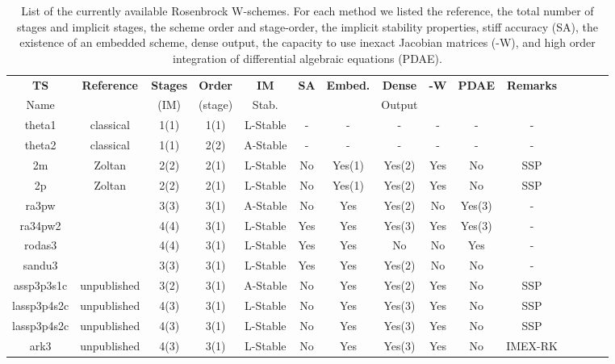 %
\begin{table}
\centering
\caption{\label{tab:IMEX:RosW:PETSc}List
of the currently available Rosenbrock W-schemes. For each method we listed the reference, the total number
  of stages and implicit stages, the scheme order and stage-order,
  the implicit stability properties, stiff accuracy (SA), the
  existence of an embedded scheme, dense output, the capacity to use
  inexact Jacobian matrices (-W), and high order integration of differential
  algebraic equations (PDAE).}
{\scriptsize
\begin{tabular}{|c|c|c|c|c|c|c|c|c|c|c|c|c|c|c|}
\hline
{\bf TS} &{\bf Reference}& {\bf Stages} &{\bf Order}&{\bf IM}     &{\bf SA}&{\bf Embed.}&{\bf Dense}&{\bf -W}&{\bf PDAE} &{\bf Remarks}\\
Name &  &(IM)   &(stage)&Stab.&&      &Output&&&\\
\hline
theta1& classical&
1(1)&1(1)&L-Stable&-&-&-&-&-&-\\
\hline
theta2& classical&
1(1)&2(2)&A-Stable&-&-&-&-&-&-\\
\hline
2m             &Zoltan&
2(2)&2(1)&L-Stable&No&Yes(1)&Yes(2)&Yes&No&SSP\\
\hline
2p             &Zoltan&
2(2)&2(1)&L-Stable&No&Yes(1)&Yes(2)&Yes&No&SSP\\
\hline
ra3pw          &\cite{Rang_2005}&
3(3)&3(1)&A-Stable&No&Yes&Yes(2)&No&Yes(3)&-\\
\hline
ra34pw2        &\cite{Rang_2005}&
4(4)&3(1)&L-Stable&Yes&Yes&Yes(3)&Yes&Yes(3)&-\\
\hline
rodas3         &\cite{Sandu_1997}&
4(4)&3(1)&L-Stable&Yes&Yes&No&No&Yes&-\\
\hline
sandu3         &\cite{Sandu_1997}&
3(3)&3(1)&L-Stable&Yes&Yes&Yes(2)&No&No&-\\
\hline
assp3p3s1c &unpublished&
3(2)&3(1)&A-Stable&No&Yes&Yes(2)&Yes&No&SSP\\
\hline
lassp3p4s2c&unpublished&
4(3)&3(1)&L-Stable&No&Yes&Yes(3)&Yes&No&SSP\\
\hline
lassp3p4s2c&unpublished&
4(3)&3(1)&L-Stable&No&Yes&Yes(3)&Yes&No&SSP\\
\hline
ark3       &unpublished&
4(3)&3(1)&L-Stable&No&Yes&Yes(3)&Yes&No&IMEX-RK\\
\hline
\end{tabular}}
\end{table}
%
